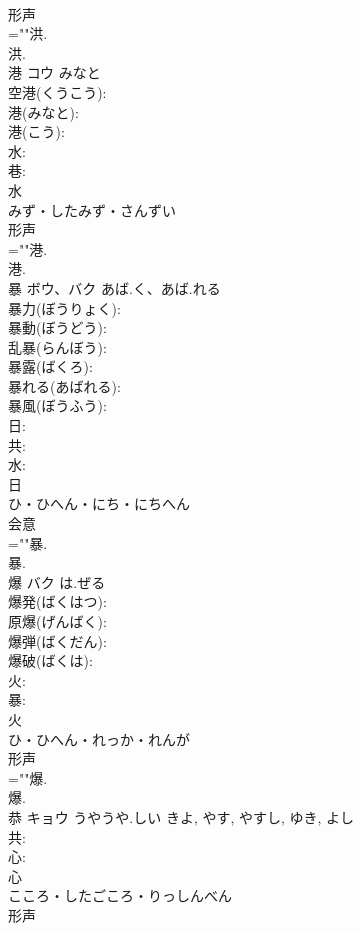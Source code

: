 \documentclass[8pt]{extreport}
\begin{document}
\begin{CJK}{UTF8}{min}
\\	形声 
\\	=""洪.
\\	洪.
\\	港	コウ	みなと		
\\	空港(くうこう): 
\\	港(みなと): 
\\	港(こう): 
\\	水: 
\\	巷: 
\\	水	
\\	みず・したみず・さんずい	
\\	形声 
\\	=""港.
\\	港.
\\	暴	ボウ、バク	あば.く、あば.れる		
\\	暴力(ぼうりょく): 
\\	暴動(ぼうどう): 
\\	乱暴(らんぼう): 
\\	暴露(ばくろ): 
\\	暴れる(あばれる): 
\\	暴風(ぼうふう): 
\\	日: 
\\	共: 
\\	水: 
\\	日	
\\	ひ・ひへん・にち・にちへん	
\\	会意 
\\	=""暴.
\\	暴.
\\	爆	バク	は.ぜる		
\\	爆発(ばくはつ): 
\\	原爆(げんばく): 
\\	爆弾(ばくだん): 
\\	爆破(ばくは): 
\\	火: 
\\	暴: 
\\	火	
\\	ひ・ひへん・れっか・れんが	
\\	形声 
\\	=""爆.
\\	爆.
\\	恭	キョウ	うやうや.しい	きよ, やす, やすし, ゆき, よし	
\\	共: 
\\	心: 
\\	心	
\\	こころ・したごころ・りっしんべん	
\\	形声 

\end{CJK}
\end{document}
